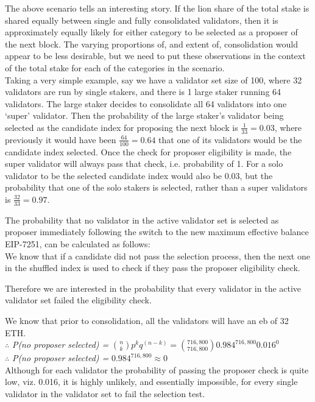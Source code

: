 The above scenario tells an interesting story. If the lion share of the total stake is shared equally between single and fully consolidated validators, then it is approximately equally likely for either category to be selected as a proposer of the next block. The varying proportions of, and extent of, consolidation would appear to be less desirable, but we need to put these observations in the context of the total stake for each of the categories in the scenario. \\

Taking a very simple example, say we have a validator set size of 100, where 32 validators are run by single stakers, and there is 1 large staker running 64 validators. The large staker decides to consolidate all 64 validators into one `super' validator. Then the probability of the large staker's validator being selected as the candidate index for proposing the next block is $\frac{1}{33} = 0.03$, where previously it would have been $\frac{64}{100} = 0.64$ that one of its validators would be the candidate index selected. Once the check for proposer eligibility is made, the super validator will always pass that check, i.e. probability of 1. For a solo validator to be the selected candidate index would also be 0.03, but the probability that one of the solo stakers is selected, rather than a super validators is $\frac{32}{33} = 0.97$.

\noindent
\clearpage
\noindent
The probability that no validator in the active validator set is selected as proposer immediately following the switch to the new maximum effective balance EIP-7251, can be calculated as follows:\\

We know that if a candidate did not pass the selection process, then the next one in the shuffled index is used to check if they pass the proposer eligibility check. 

Therefore we are interested in the probability that every  validator in the active validator set failed the eligibility check.

We know that prior to consolidation, all the validators will have an \gls{eb} of 32 ETH.\\
$\therefore$ \textit{ P(no proposer selected) =} $\binom{n}{k} p^k q^{(n-k)} = \binom{716,800}{716,800} 0.984^{716,800}0.016^0$ \\
$\therefore$ \textit{ P(no proposer selected) = } $0.984^{716,800} \approx 0$ \\
Although for each validator the probability of passing the proposer check is quite low, viz. 0.016, it is highly unlikely, and essentially impossible, for every single validator in the validator set to fail the selection test.\\

